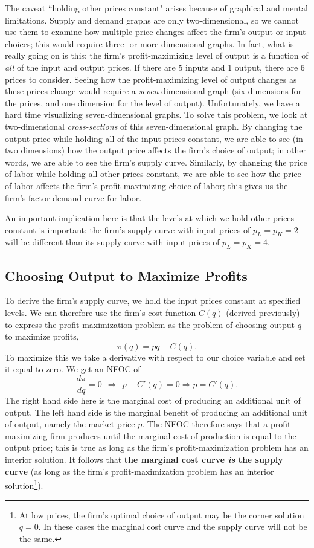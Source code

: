 The caveat ``holding other prices constant" arises because of graphical and mental limitations. Supply and demand graphs are only two-dimensional, so we cannot use them to examine how multiple price changes affect the firm's output or input choices; this would require three- or more-dimensional graphs. In fact, what is really going on is this: the firm's profit-maximizing level of output is a function of \emph{all} of the input and output prices. If there are 5 inputs and 1 output, there are 6 prices to consider. Seeing how the profit-maximizing level of output changes as these prices change would require a \emph{seven}-dimensional graph (six dimensions for the prices, and one dimension for the level of output). Unfortunately, we have a hard time visualizing seven-dimensional graphs. To solve this problem, we look at two-dimensional \emph{cross-sections} of this seven-dimensional graph. By changing the output price while holding all of the input prices constant, we are able to see (in two dimensions) how the output price affects the firm's choice of output; in other words, we are able to see the firm's supply curve. Similarly, by changing the price of labor while holding all other prices constant, we are able to see how the price of labor affects the firm's profit-maximizing choice of labor; this gives us the firm's factor demand curve for labor.

An important implication here is that the levels at which we hold other prices constant is important: the firm's supply curve with input prices of $p_L=p_K=2$ will be different than its supply curve with input prices of $p_L=p_K=4$.


\subsection*{Choosing Output to Maximize Profits}

To derive the firm's supply curve, we hold the input prices constant at specified levels. We can therefore use the firm's cost function $C(q)$ (derived previously) to express the profit maximization problem as the problem of choosing output $q$ to maximize profits,
\[
\pi (q) = p q - C(q).
\]
To maximize this we take a derivative with respect to our choice variable and set it equal to zero. We get an NFOC of
\[
\frac{d\pi}{dq}=0\ \ \Longrightarrow \ \ p -
C'(q)=0\Longrightarrow p = C'(q).
\]
The right hand side here is the marginal cost of producing an additional unit of output. The left hand side is the marginal benefit of producing an additional unit of output, namely the market price $p$. The NFOC therefore says that a profit-maximizing firm produces until the marginal cost of production is equal to the output price; this is true as long as the firm's profit-maximization problem has an interior solution. It follows that \textbf{the marginal cost curve \emph{is} the supply curve} (as long as the firm's profit-maximization problem has an interior solution\footnote{At low prices, the firm's optimal choice of output may be the corner solution $q=0$. In these cases the marginal cost curve and the supply curve will not be the same.}).


